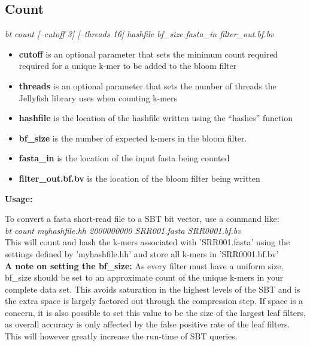 \documentclass{article}
\begin{document}
\subsection{Count}
\textit{bt count [--cutoff 3] [--threads 16] hashfile bf\_size fasta\_in filter\_out.bf.bv}
\begin{itemize}
\item \textbf{cutoff} is an optional parameter that sets the minimum count required required for a unique k-mer to be added to the bloom filter
\item \textbf{threads} is an optional parameter that sets the number of threads the Jellyfish library uses when counting k-mers
\item \textbf{hashfile} is the location of the hashfile written using the ``hashes'' function
\item \textbf{bf\_size} is the number of expected k-mers in the bloom filter. 
\item \textbf{fasta\_in} is the location of the input fasta being counted
\item \textbf{filter\_out.bf.bv} is the location of the bloom filter being written
\end{itemize}
\textbf{Usage:}

To convert a fasta short-read file to a SBT bit vector, use a command like: \\

\textit{bt count myhashfile.hh 2000000000 SRR001.fasta SRR0001.bf.bv} \\

This will count and hash the k-mers associated with 'SRR001.fasta' using the settings defined by 'myhashfile.hh' and store all k-mers in 'SRR0001.bf.bv' \\

\textbf{A note on setting the bf\_size:}
As every filter must have a uniform size, bf\_size should be set to an approximate count of the unique k-mers in your complete data set. This avoids saturation in the highest levels of the SBT and is the extra space is largely factored out through the compression step. If space is a concern, it is also possible to set this value to be the size of the largest leaf filters, as overall accuracy is only affected by the false positive rate of the leaf filters. This will however greatly increase the run-time of SBT queries. 
\end{document}
